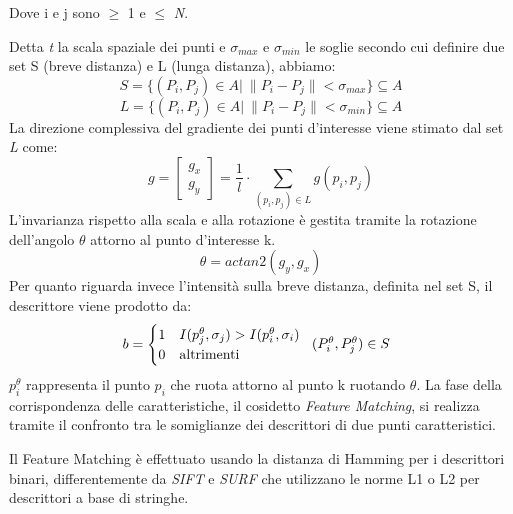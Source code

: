 \noindent Dove i e j sono \(\geq\) 1 e \(\leq\) \textit{N}.\par
\noindent Detta \textit{t} la scala spaziale dei punti e \(\sigma_{max}\) e \(\sigma_{min}\) le soglie secondo cui definire due set S (breve distanza) e L (lunga distanza), abbiamo:
\begin{equation}
	S = \{ (P_{i}, P_{j}) \in A |\ \| P_{i} - P_{j} \| < \sigma_{max}\} \subseteq A
\end{equation}
\begin{equation}
	L = \{ (P_{i}, P_{j}) \in A |\ \| P_{i} - P_{j} \| < \sigma_{min}\} \subseteq A	
\end{equation}
\noindent La direzione complessiva del gradiente dei punti d'interesse viene stimato dal set \textit{L} come:
\begin{equation}
	g = \begin{bmatrix} g_{x} \\ g_{y} \end{bmatrix} = \frac{1}{l} \cdot \sum_{(p_{i}, p_{j}) \in L} g(p_{i}, p_{j})
\end{equation}
\noindent L'invarianza rispetto alla scala e alla rotazione è gestita tramite la rotazione dell'angolo \(\theta\) attorno al punto d'interesse k.
\begin{equation}
	\theta = {actan2} (g_{y}, g_{x})
\end{equation}
\noindent Per quanto riguarda invece l'intensità sulla breve distanza, definita nel set S, il descrittore viene prodotto da:
\begin{equation}
  b =
    \begin{cases}
      1 & \text{\(I(p_{j}^{\theta}, \sigma_{j}) > I(p_{i}^{\theta}, \sigma_{i})\)}  \\
      0 & \text{altrimenti}
    \end{cases}       
    \begin{tabular}{c}
      \text{\((P_{i}^{\theta}, P_{j}^{\theta}) \in S\)}
    \end{tabular}
\end{equation}
\noindent \(p_{i}^{\theta}\) rappresenta il punto \(p_{i}\) che ruota attorno al punto k ruotando \(\theta\). \hfill \break
\noindent La fase della corrispondenza delle caratteristiche, il cosidetto \textit{Feature Matching}, si realizza tramite il confronto tra le somiglianze dei descrittori di due punti caratteristici. \par
\noindent Il Feature Matching è effettuato usando la distanza di Hamming per i descrittori binari, differentemente da \textit{SIFT} e \textit{SURF} che utilizzano le norme L1 o L2 per descrittori a base di stringhe. \par
